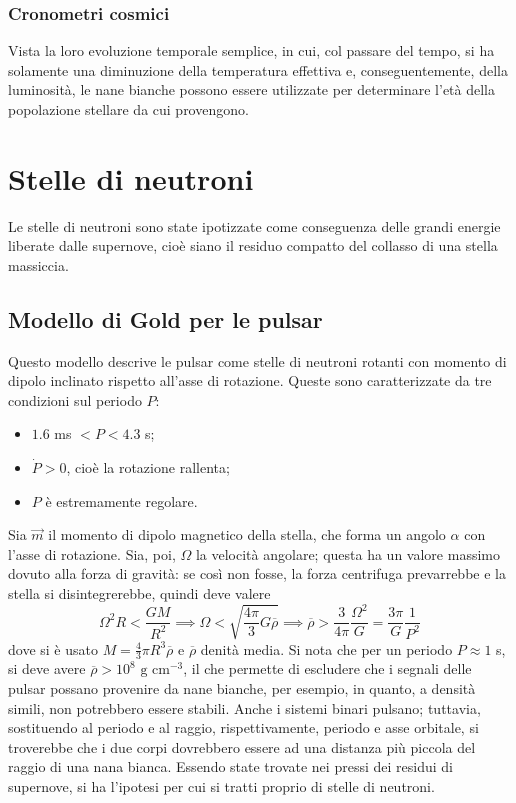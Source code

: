 \documentclass[11pt, a4paper]{scrartcl}
\theoremstyle{style}
\theoremstyle{style1}
\numberwithin{equation}{subsection}
\begin{document}
\subsubsection{Cronometri cosmici}
Vista la loro evoluzione temporale semplice, in cui, col passare del tempo, si ha solamente una diminuzione della temperatura effettiva e, conseguentemente, della luminosit\`a, le nane bianche possono essere utilizzate per determinare l'et\`a della popolazione stellare da cui provengono.


\newpage 

\section{Stelle di neutroni}
Le stelle di neutroni sono state ipotizzate come conseguenza delle grandi energie liberate dalle supernove, cio\`e siano il residuo compatto del collasso di una stella massiccia.
\subsection{Modello di Gold per le pulsar}

Questo modello descrive le pulsar come stelle di neutroni rotanti con momento di dipolo inclinato rispetto all'asse di rotazione.
Queste sono caratterizzate da tre condizioni sul periodo $P$:
\begin{itemize}
	\item $1.6$ ms $< P < 4.3$ s;
	\item $\dot{P} > 0$, cio\`e la rotazione rallenta;
	\item $P$ \`e estremamente regolare.
\end{itemize}
Sia $\vec{m}$ il momento di dipolo magnetico della stella, che forma un angolo $\alpha $ con l'asse di rotazione.
Sia, poi, $\Omega $ la velocit\`a angolare; questa ha un valore massimo dovuto alla forza di gravit\`a: se cos\`i non fosse, la forza centrifuga prevarrebbe e la stella si disintegrerebbe, quindi deve valere 
\[
\Omega ^2 R < \frac{GM}{R^2} \implies \Omega  < \sqrt{\frac{4\pi}{3}G \overline{\rho }} \implies \overline{\rho } > \frac{3}{4 \pi } \frac{\Omega ^2}{ G} = \frac{3 \pi }{G} \frac{1}{P^2}
\] 
dove si \`e usato $M = \frac{4}{3}  \pi R^3 \overline{\rho }$ e $\overline{\rho} $ denit\`a media.
Si nota che per un periodo $P \approx 1$ s, si deve avere $\overline{\rho } > 10^8 \text{ g cm}^{-3}$, il che permette di escludere che i segnali delle pulsar possano provenire da nane bianche, per esempio, in quanto, a densit\`a simili, non potrebbero essere stabili.
Anche i sistemi binari pulsano; tuttavia, sostituendo al periodo e al raggio, rispettivamente, periodo e asse orbitale, si troverebbe che i due corpi dovrebbero essere ad una distanza pi\`u piccola del raggio di una nana bianca.
Essendo state trovate nei pressi dei residui di supernove, si ha l'ipotesi per cui si tratti proprio di stelle di neutroni.
\end{document}
